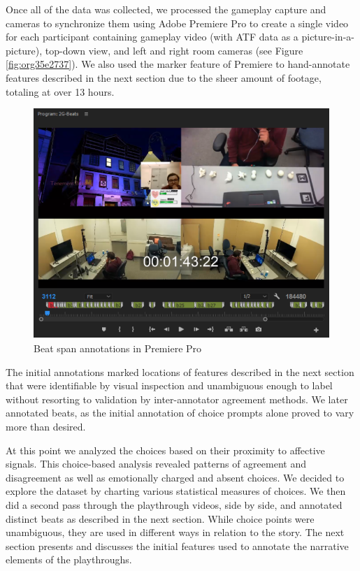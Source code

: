 Once all of the data was collected, we processed the gameplay capture
and cameras to synchronize them using Adobe Premiere Pro to create a
single video for each participant containing gameplay video (with ATF
data as a picture-in-a-picture), top-down view, and left and right
room cameras (see Figure \ref{fig:org35e2737}). We also used the marker feature of
Premiere to hand-annotate features described in the next section due
to the sheer amount of footage, totaling at over 13 hours.
\begin{figure}[htbp]
\centering
\includegraphics[width=.9\linewidth]{figures/fig2.PNG}
\caption{\label{fig:orgf7d7ebb}
Beat span annotations in Premiere Pro}
\end{figure}

The initial annotations marked locations of features described in the
next section that were identifiable by visual inspection and
unambiguous enough to label without resorting to validation by
inter-annotator agreement methods. We later annotated beats, as the
initial annotation of choice prompts alone proved to vary more than
desired.

At this point we analyzed the choices based on their proximity to
affective signals. This choice-based analysis revealed patterns of
agreement and disagreement as well as emotionally charged and absent
choices. We decided to explore the dataset by charting various
statistical measures of choices. We then did a second pass through the
playthrough videos, side by side, and annotated distinct beats as
described in the next section. While choice points were unambiguous,
they are used in different ways in relation to the story. The next
section presents and discusses the initial features used to annotate
the narrative elements of the playthroughs.


